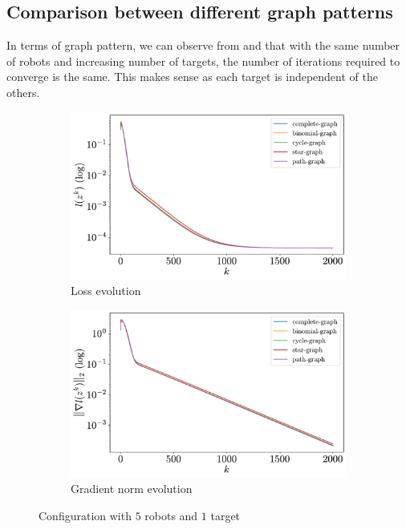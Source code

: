 \documentclass[a4paper,11pt,oneside]{book}
\begin{document}
\subsection{Comparison between different graph patterns}

In terms of graph pattern, we can observe from  and  that with the same number of robots and increasing number of targets, the number of iterations required to converge is the same. This makes sense as each target is independent of the others.

\begin{figure}[ht]
      \centering
      \begin{subfigure}[t]{0.49\textwidth}
            \centering
            \includegraphics[width=\linewidth]{./figs/tracking/loss_5_1_2_2000.pdf} 
            \caption{Loss evolution}
      \end{subfigure}
      \hfill
      \begin{subfigure}[t]{0.49\textwidth}
            \centering
            \includegraphics[width=\linewidth]{./figs/tracking/gradient_5_1_2_2000.pdf} 
            \caption{Gradient norm evolution}
      \end{subfigure}
      \caption{Configuration with $5$ robots and $1$ target}
      \label{fig:tracking_5_1}
\end{figure}
\end{document}
